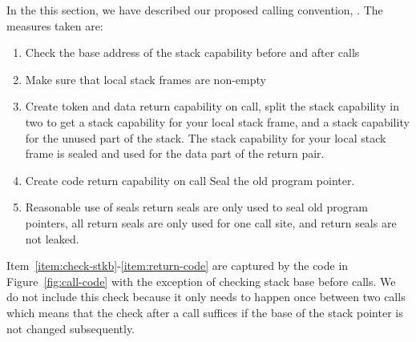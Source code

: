 \documentclass[acmsmall,review,anonymous]{acmart}\settopmatter{printfolios=true,printccs=false,printacmref=false}
\begin{document}
In the this section, we have described our proposed calling convention, \stktokens{}. The measures taken are:
\begin{enumerate}
\item \label{item:check-stkb} Check the base address of the stack capability before and after calls
\item \label{item:non-empty-sf} Make sure that local stack frames are non-empty
\item \label{item:return-data} Create token and data return capability on call, split the stack capability in two to get a stack capability for your local stack frame, and a stack capability for the unused part of the stack. The stack capability for your local stack frame is sealed and used for the data part of the return pair.
\item \label{item:return-code} Create code return capability on call Seal the old program pointer.
\item Reasonable use of seals return seals are only used to seal old program pointers, all return seals are only used for one call site, and return seals are not leaked.
\end{enumerate}
Item~\ref{item:check-stkb}-\ref{item:return-code} are captured by the code in Figure~\ref{fig:call-code} with the exception of checking stack base before calls. We do not include this check because it only needs to happen once between two calls which means that the check after a call suffices if the base of the stack pointer is not changed subsequently.
\end{document}
